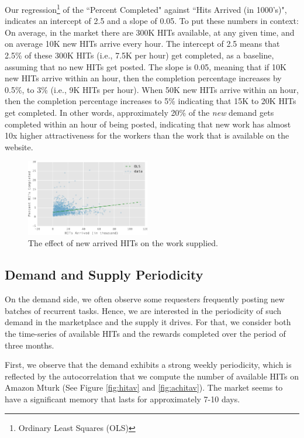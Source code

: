 Our regression\footnote{Ordinary Least Squares (OLS)} of the ``Percent Completed" against ``Hits Arrived (in
1000's)", indicates an intercept of 2.5 and a slope of 0.05. To put
these numbers in context: On average, in the market there are 300K
HITs available, at any given time, and on average 10K new HITs arrive
every hour. The intercept of 2.5 means that 2.5\% of these 300K HITs
(i.e., 7.5K per hour) get completed, as a baseline, assuming that no
new HITs get posted. The slope is 0.05, meaning that if 10K new HITs
arrive within an hour, then the completion percentage increases by
0.5\%, to 3\% (i.e., 9K HITs per hour). When 50K new HITs arrive within
an hour, then the completion percentage increases to 5\% indicating
that 15K to 20K HITs get completed. In other words, approximately 20\%
of the \emph{new} demand gets completed within an hour of being posted,
indicating that new work has almost 10x higher attractiveness for the
workers than the work that is available on the website.

\begin{figure}[t!]
	\centering
	\includegraphics[width=0.48\textwidth]{figures/percent.pdf}
	\caption{The effect of new arrived HITs on the work  supplied.}
	\label{fig:perc_hits_completed}
\end{figure}

\subsection{Demand and Supply Periodicity}
On the demand side, we often observe some requesters frequently posting new batches of recurrent tasks. Hence, we are interested in the periodicity of such demand in the marketplace and the supply it drives. For that, we consider both the time-series of available HITs and the rewards completed over the period of three months. 

First, we observe that the demand exhibits a strong weekly periodicity, which is reflected by the autocorrelation that we compute the number of available HITs on Amazon Mturk (See Figure \ref{fig:hitav} and \ref{fig:achitav}). The market seems to have a significant memory that lasts for approximately 7-10 days.

